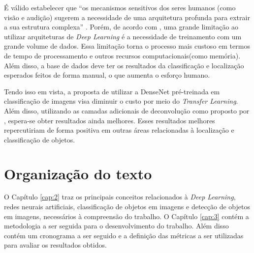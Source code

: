 É válido estabelecer que ``os mecanismos sensitivos dos seres humanos (como visão e audição) sugerem a necessidade de uma arquitetura profunda para extrair a sua estrutura complexa'' \cite{deng-2014}. Porém, de acordo com , uma grande limitação ao utilizar arquiteturas de \emph{Deep Learning} é a necessidade de treinamento com um grande volume de dados. Essa limitação torna o processo mais custoso em termos de tempo de processamento e outros recursos computacionais(como memória). Além disso, a base de dados deve ter os resultados da classificação e localização esperados feitos de forma manual, o que aumenta o esforço humano.

Tendo isso em vista, a proposta de utilizar a \ac{DenseNet} \cite{liu-2017} pré-treinada em classificação de imagens visa diminuir o custo por meio do \textit{Transfer Learning}. Além disso, utilizando as camadas adicionais de deconvolução como proposto por , espera-se obter resultados ainda melhores. Esses resultados melhores repercutiriam de forma positiva em outras áreas relacionadas à localização e classificação de objetos. 

\section{Organização do texto}
\label{secao:1:4}

O Capítulo \ref{cap:2} traz os principais conceitos relacionados à \textit{Deep Learning}, redes neurais artificiais, classificação de objetos em imagens e detecção de objetos em imagens, necessários à compreensão do trabalho. O Capítulo \ref{cap:3} contém a metodologia a ser seguida para o desenvolvimento do trabalho. Além disso contém um cronograma a ser seguido e a definição das métricas a ser utilizadas para avaliar os resultados obtidos.